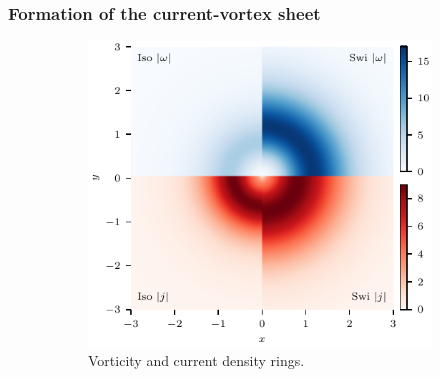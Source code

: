 \subsubsection{Formation of the current-vortex sheet}

\begin{figure}[t]
  \centering
    \begin{subfigure}{0.49\textwidth}
      \includegraphics[width=\linewidth]{v-4r-4_vorticity_current_ring_t_3}
      \caption{Vorticity and current density rings.}
      \label{fig:v-4r-4_vorticity_current_ring_t_3}
    \end{subfigure}
    \hfill
    \begin{subfigure}{0.49\textwidth}

\end{subfigure}
\end{figure}
